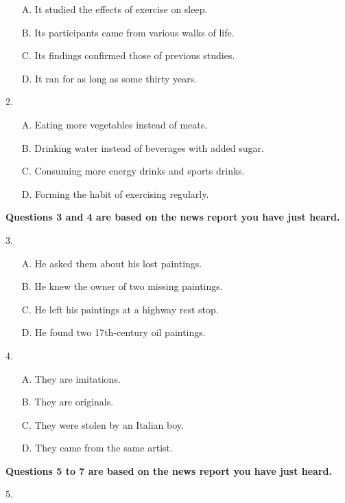 \documentclass[UTF8,11pt]{ctexart}
\begin{document}
\begin{itemize}[leftmargin=2em,itemsep=.2em,topsep=.4em]\item[A.] It studied the effects of exercise on sleep.
\item[B.] Its participants came from various walks of life.
\item[C.] Its findings confirmed those of previous studies.
\item[D.] It ran for as long as some thirty years.
\end{itemize}

2.


\begin{itemize}[leftmargin=2em,itemsep=.2em,topsep=.4em]\item[A.] Eating more vegetables instead of meats.
\item[B.] Drinking water instead of beverages with added sugar.
\item[C.] Consuming more energy drinks and sports drinks.
\item[D.] Forming the habit of exercising regularly.
\end{itemize}

\textbf{Questions 3 and 4 are based on the news report you have just heard.}


3.


\begin{itemize}[leftmargin=2em,itemsep=.2em,topsep=.4em]\item[A.] He asked them about his lost paintings.
\item[B.] He knew the owner of two missing paintings.
\item[C.] He left his paintings at a highway rest stop.
\item[D.] He found two 17th-century oil paintings.
\end{itemize}

4.


\begin{itemize}[leftmargin=2em,itemsep=.2em,topsep=.4em]\item[A.] They are imitations.
\item[B.] They are originals.
\item[C.] They were stolen by an Italian boy.
\item[D.] They came from the same artist.
\end{itemize}

\textbf{Questions 5 to 7 are based on the news report you have just heard.}


5.
\end{document}
